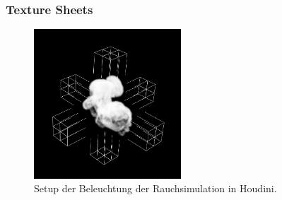 \subsubsection{Texture Sheets}
\label{sec:4.2.1}
\begin{figure}[h!]
	\includegraphics[width=0.49\textwidth]{Grafiken/Implementation/Lightmaps/Smoke_LightSetup.png}
	\centering
	\begin{footnotesize}
		\caption{Setup der Beleuchtung der Rauchsimulation in Houdini.}
		\label{fig:lightSetup}
	\end{footnotesize}
\end{figure}

